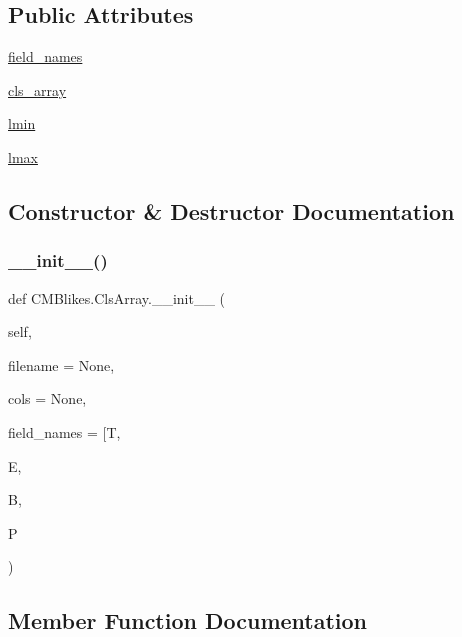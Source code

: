 \subsection*{Public Attributes}
\begin{DoxyCompactItemize}
\item 
\mbox{\hyperlink{classCMBlikes_1_1ClsArray_af8bcb5683fef2fd567b8d0c280d5f77d}{field\+\_\+names}}
\item 
\mbox{\hyperlink{classCMBlikes_1_1ClsArray_a7f768dded682311b93b1e6d1e2b4da3c}{cls\+\_\+array}}
\item 
\mbox{\hyperlink{classCMBlikes_1_1ClsArray_a6b393b29f03d4865dd01517d0086e82c}{lmin}}
\item 
\mbox{\hyperlink{classCMBlikes_1_1ClsArray_a1e25a11f8dcb03c18c74f76e04299b3f}{lmax}}
\end{DoxyCompactItemize}


\subsection{Constructor \& Destructor Documentation}
\mbox{\label{classCMBlikes_1_1ClsArray_ada047a96ea77f678d49644d8a3a66ad8}} 
\subsubsection{\texorpdfstring{\+\_\+\+\_\+init\+\_\+\+\_\+()}{\_\_init\_\_()}}
{\footnotesize\ttfamily def C\+M\+Blikes.\+Cls\+Array.\+\_\+\+\_\+init\+\_\+\+\_\+ (\begin{DoxyParamCaption}\item[{}]{self,  }\item[{}]{filename = {\ttfamily None},  }\item[{}]{cols = {\ttfamily None},  }\item[{}]{field\+\_\+names = {\ttfamily \mbox{[}\textquotesingle{}T\textquotesingle{}},  }\item[{}]{E,  }\item[{}]{B,  }\item[{}]{P }\end{DoxyParamCaption})}



\subsection{Member Function Documentation}
\mbox{\label{classCMBlikes_1_1ClsArray_a251f3a02464afa3664bfc493f5c74aa2}} 
